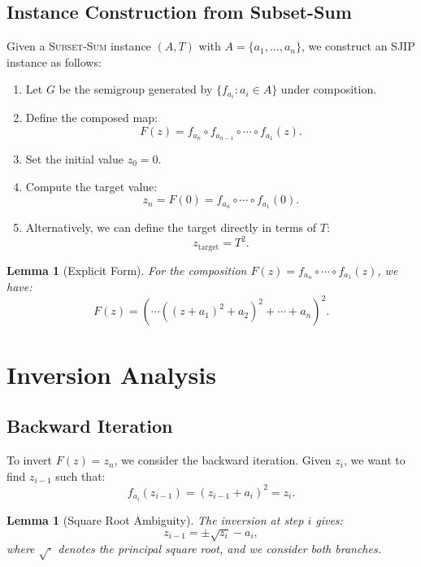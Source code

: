 \documentclass[11pt]{article}
\newtheorem{lemma}[theorem]{Lemma}
\begin{document}
\subsection{Instance Construction from Subset-Sum}
Given a \textsc{Subset-Sum} instance $(A, T)$ with $A = \{a_1, \dots, a_n\}$, we construct an SJIP instance as follows:

\begin{enumerate}
    \item Let $G$ be the semigroup generated by $\{f_{a_i} : a_i \in A\}$ under composition.
    
    \item Define the composed map:
    \[
    F(z) = f_{a_n} \circ f_{a_{n-1}} \circ \cdots \circ f_{a_1}(z).
    \]
    
    \item Set the initial value $z_0 = 0$.
    
    \item Compute the target value:
    \[
    z_n = F(0) = f_{a_n} \circ \cdots \circ f_{a_1}(0).
    \]
    
    \item Alternatively, we can define the target directly in terms of $T$:
    \[
    z_{\text{target}} = T^2.
    \]
\end{enumerate}

\begin{lemma}[Explicit Form]
\label{lem:explicit}
For the composition $F(z) = f_{a_n} \circ \cdots \circ f_{a_1}(z)$, we have:
\[
F(z) = \left( \cdots \left( (z + a_1)^2 + a_2 \right)^2 + \cdots + a_n \right)^2.
\]
\end{lemma}

\section{Inversion Analysis}

\subsection{Backward Iteration}
To invert $F(z) = z_n$, we consider the backward iteration. Given $z_i$, we want to find $z_{i-1}$ such that:
\[
f_{a_i}(z_{i-1}) = (z_{i-1} + a_i)^2 = z_i.
\]

\begin{lemma}[Square Root Ambiguity]
\label{lem:sqrt}
The inversion at step $i$ gives:
\[
z_{i-1} = \pm\sqrt{z_i} - a_i,
\]
where $\sqrt{\cdot}$ denotes the principal square root, and we consider both branches.
\end{lemma}
\end{document}

